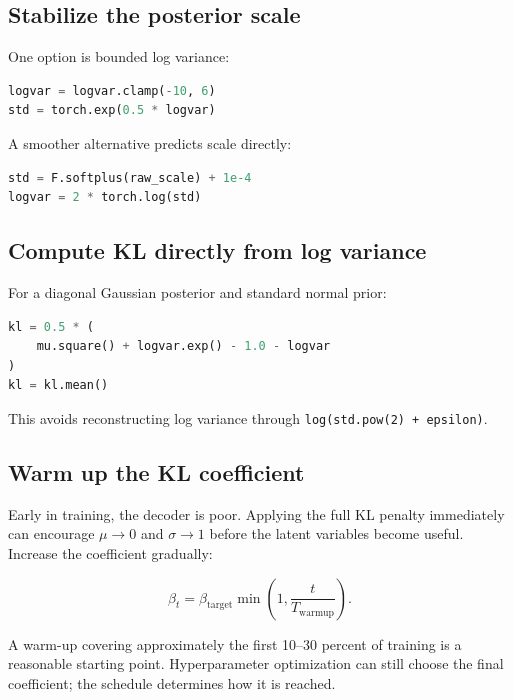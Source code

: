 \documentclass[11pt,a4paper]{article}
\begin{document}
\subsection{Stabilize the posterior scale}

One option is bounded log variance:

\begin{lstlisting}[language=Python]
logvar = logvar.clamp(-10, 6)
std = torch.exp(0.5 * logvar)
\end{lstlisting}

A smoother alternative predicts scale directly:

\begin{lstlisting}[language=Python]
std = F.softplus(raw_scale) + 1e-4
logvar = 2 * torch.log(std)
\end{lstlisting}

\subsection{Compute KL directly from log variance}

For a diagonal Gaussian posterior and standard normal prior:

\begin{lstlisting}[language=Python]
kl = 0.5 * (
    mu.square() + logvar.exp() - 1.0 - logvar
)
kl = kl.mean()
\end{lstlisting}

This avoids reconstructing log variance through
\texttt{log(std.pow(2) + epsilon)}.

\subsection{Warm up the KL coefficient}

Early in training, the decoder is poor. Applying the full KL penalty immediately
can encourage $\mu\rightarrow0$ and $\sigma\rightarrow1$ before the latent
variables become useful. Increase the coefficient gradually:

\begin{equation}
  \beta_t = \beta_{\mathrm{target}}
  \min\left(1,\frac{t}{T_{\mathrm{warmup}}}\right).
\end{equation}

A warm-up covering approximately the first 10--30 percent of training is a
reasonable starting point. Hyperparameter optimization can still choose the
final coefficient; the schedule determines how it is reached.
\end{document}
